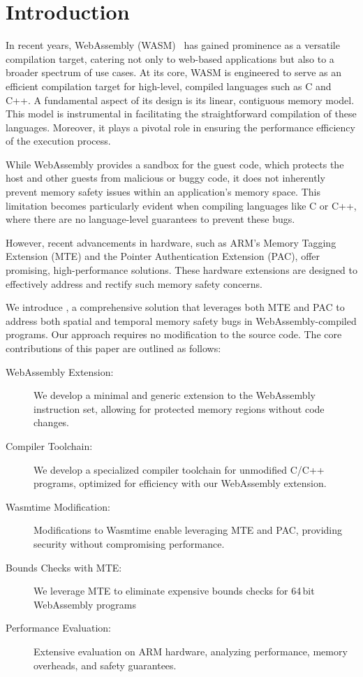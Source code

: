 \chapter{Introduction}
\label{ch:intro}

In recent years, WebAssembly (WASM)~\cite{haas2017bringing} has gained prominence as a versatile compilation target, catering not only to web-based applications but also to a broader spectrum of use cases.
At its core, WASM is engineered to serve as an efficient compilation target for high-level, compiled languages such as C and C++.
A fundamental aspect of its design is its linear, contiguous memory model.
This model is instrumental in facilitating the straightforward compilation of these languages.
Moreover, it plays a pivotal role in ensuring the performance efficiency of the execution process.

While WebAssembly provides a sandbox for the guest code, which protects the host and other guests from malicious or buggy code, it does not inherently prevent memory safety issues within an application's memory space.
This limitation becomes particularly evident when compiling languages like C or C++, where there are no language-level guarantees to prevent these bugs.

However, recent advancements in hardware, such as ARM's Memory Tagging Extension (MTE) and the Pointer Authentication Extension (PAC), offer promising, high-performance solutions. These hardware extensions are designed to effectively address and rectify such memory safety concerns.

We introduce \projectname{}, a comprehensive solution that leverages both MTE and PAC to address both spatial and temporal memory safety bugs in WebAssembly-compiled programs.
Our approach requires no modification to the source code.
The core contributions of this paper are outlined as follows:

\begin{description}
    \item[WebAssembly Extension:] We develop a minimal and generic extension to the WebAssembly instruction set, allowing for protected memory regions without code changes.
    \item[Compiler Toolchain:] We develop a specialized compiler toolchain for unmodified C/C++ programs, optimized for efficiency with our WebAssembly extension.
    \item[Wasmtime Modification:] Modifications to Wasmtime enable leveraging MTE and PAC, providing security without compromising performance.
    \item[Bounds Checks with MTE:] We leverage MTE to eliminate expensive bounds checks for 64\,bit WebAssembly programs
    \item[Performance Evaluation:] Extensive evaluation on ARM hardware, analyzing performance, memory overheads, and safety guarantees.
\end{description}
